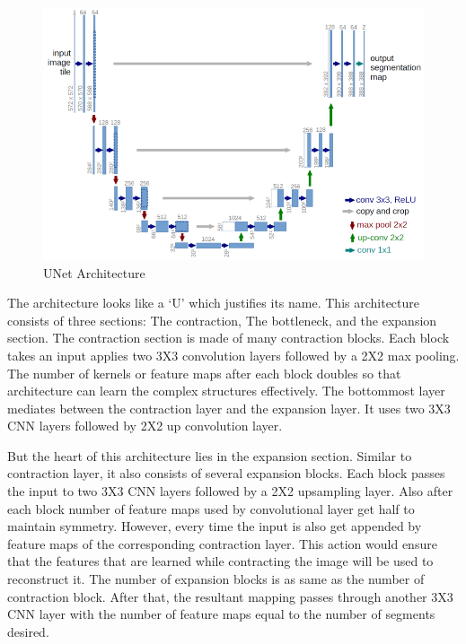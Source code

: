 \begin{enumerate}
    \begin{figure}[h!]
       \centering
       \includegraphics[scale=0.5]{Figures/unet.png}
       \caption[UNet Architecture]{UNet Architecture}
       \label{fig:UNet Architecture}
   \end{figure}
   
   The architecture looks like a ‘U’ which justifies its name. This architecture consists of three sections: The contraction, The bottleneck, and the expansion section. The contraction section is made of many contraction blocks. Each block takes an input applies two 3X3 convolution layers followed by a 2X2 max pooling. The number of kernels or feature maps after each block doubles so that architecture can learn the complex structures effectively. The bottommost layer mediates between the contraction layer and the expansion layer. It uses two 3X3 CNN layers followed by 2X2 up convolution layer.

    But the heart of this architecture lies in the expansion section. Similar to contraction layer, it also consists of several expansion blocks. Each block passes the input to two 3X3 CNN layers followed by a 2X2 upsampling layer. Also after each block number of feature maps used by convolutional layer get half to maintain symmetry. However, every time the input is also get appended by feature maps of the corresponding contraction layer. This action would ensure that the features that are learned while contracting the image will be used to reconstruct it. The number of expansion blocks is as same as the number of contraction block. After that, the resultant mapping passes through another 3X3 CNN layer with the number of feature maps equal to the number of segments desired.
    

\end{enumerate}
